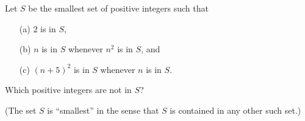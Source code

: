 Let $S$ be the smallest set of positive integers such that
\begin{enumerate}
\item[(a)]
$2$ is in $S$,
\item[(b)]
$n$ is in $S$ whenever $n^2$ is in $S$, and
\item[(c)]
$(n+5)^2$ is in $S$ whenever $n$ is in $S$.
\end{enumerate}
Which positive integers are not in $S$?

(The set $S$ is ``smallest'' in the sense that $S$ is contained in any other such set.)
